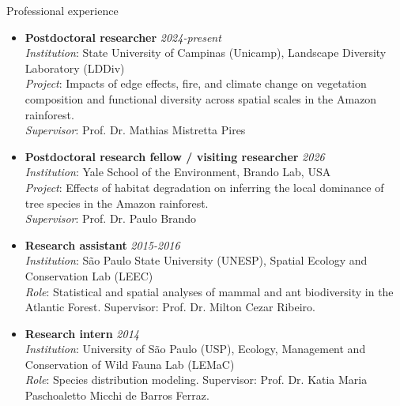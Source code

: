 \documentclass{resume}
\begin{document}
\begin{rSection}{Professional experience}
\begin{itemize}
\item \textbf{Postdoctoral researcher} \hfill{\em 2024-present}\\
\textit{Institution}: State University of Campinas (Unicamp), Landscape Diversity Laboratory (LDDiv)\\
\textit{Project}: Impacts of edge effects, fire, and climate change on vegetation composition and functional diversity across spatial scales in the Amazon rainforest.\\
\textit{Supervisor}: Prof. Dr. Mathias Mistretta Pires

\item \textbf{Postdoctoral research fellow / visiting researcher} \hfill{\em 2026}\\
\textit{Institution}: Yale School of the Environment, Brando Lab, USA\\
\textit{Project}: Effects of habitat degradation on inferring the local dominance of tree species in the Amazon rainforest.\\
\textit{Supervisor}: Prof. Dr. Paulo Brando

\item \textbf{Research assistant} \hfill{\em 2015-2016}\\
\textit{Institution}: São Paulo State University (UNESP), Spatial Ecology and Conservation Lab (LEEC)\\
\textit{Role}: Statistical and spatial analyses of mammal and ant biodiversity in the Atlantic Forest. Supervisor: Prof. Dr. Milton Cezar Ribeiro.

\item \textbf{Research intern} \hfill{\em 2014}\\
\textit{Institution}: University of São Paulo (USP), Ecology, Management and Conservation of Wild Fauna Lab (LEMaC)\\
\textit{Role}: Species distribution modeling. Supervisor: Prof. Dr. Katia Maria Paschoaletto Micchi de Barros Ferraz.
\end{itemize}
\end{rSection}
\end{document}
